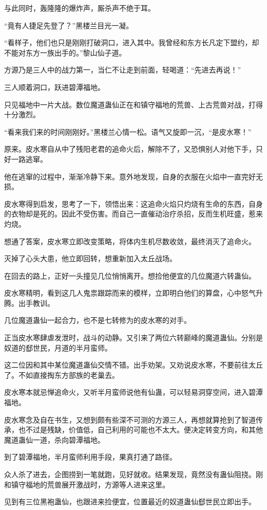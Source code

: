 \begin{this_body}
与此同时，轰隆隆的爆炸声，厮杀声不绝于耳。

“竟有人捷足先登了？”黑楼兰目光一凝。

“看样子，他们也只是刚刚打破洞口，进入其中。我曾经和东方长凡定下盟约，却不能对东方一族出手的。”黎山仙子道。

方源乃是三人中的战力第一，当仁不让走到前面，轻喝道：“先进去再说！”

三人顺着洞口，跃进碧潭福地。

只见福地中一片大战。数位魔道蛊仙正在和镇守福地的荒兽、上古荒兽对战，打得十分激烈。

“看来我们来的时间刚刚好。”黑楼兰心情一松。语气又旋即一沉，“是皮水寒！”

原来。皮水寒自从中了残阳老君的追命火后，解除不了，又恐惧别人对他下手，只好一路逃窜。

他在逃窜的过程中，渐渐冷静下来。意外地发现，自身的衣服在火焰中一直完好无损。

皮水寒得到启发，思考了一下，领悟出来：这追命火焰只灼烧有生命的东西，自身的衣物却是死的。因此不受伤害。而自己一直催动治疗杀招，反而生机旺盛，惹来灼烧。

想通了答案，皮水寒立即改变策略，将体内生机尽数收敛，最终消灭了追命火。

灭掉了心头大患，他立即回转，想重新加入太丘战场。

在回去的路上，正好一头撞见几位悄悄离开。想捡他便宜的几位魔道六转蛊仙。

皮水寒精明，看到这几人鬼祟跟踪而来的模样，立即明白他们的算盘，心中怒气升腾。出手教训。

几位魔道蛊仙一起合力，也不是七转修为的皮水寒的对手。

正当皮水寒肆虐发泄时，战斗的动静。又引来了两位六转巅峰的魔道蛊仙。分别是奴道的郄世民，月道的半月蛮师。

这二位因和其中某位魔道蛊仙交情不错。出手劝架。又劝说皮水寒，不要前往太丘了。不如直接掏东方部族的老巢去。

皮水寒本就忌惮追命火，又听半月蛮师说他有仙蛊，可以轻易洞穿空间，进入碧潭福地。

皮水寒念及自在书生，又想到颇有些深不可测的方源三人，再想就算抢到了智道传承，也不过是残缺，价值低，自己利用的可能也不太大。便决定转变方向，和其他魔道蛊仙一道，杀向碧潭福地。

到了碧潭福地，半月蛮师利用手段，果真打通了路径。

众人杀了进去，企图捞到一笔就跑，见好就收。结果发现，竟然没有蛊仙阻挠。刚和镇守福地的荒兽展开激战时，方源等人进来这里。

见到有三位黑袍蛊仙，也跟进来捡便宜，位置最近的奴道蛊仙郄世民立即出手。


\end{this_body}
